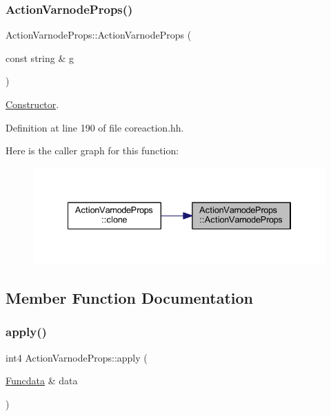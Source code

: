 \subsubsection{\texorpdfstring{ActionVarnodeProps()}{ActionVarnodeProps()}}
{\footnotesize\ttfamily Action\+Varnode\+Props\+::\+Action\+Varnode\+Props (\begin{DoxyParamCaption}\item[{const string \&}]{g }\end{DoxyParamCaption})\hspace{0.3cm}{\ttfamily [inline]}}



\mbox{\hyperlink{class_constructor}{Constructor}}. 



Definition at line 190 of file coreaction.\+hh.

Here is the caller graph for this function\+:
\nopagebreak
\begin{figure}[H]
\begin{center}
\leavevmode
\includegraphics[width=334pt]{class_action_varnode_props_a52f6de156a43bc14318422eb8bb03b64_icgraph}
\end{center}
\end{figure}


\subsection{Member Function Documentation}
\mbox{\label{class_action_varnode_props_a531c9985eb2e6a5796009bea79a465fe}} 
\subsubsection{\texorpdfstring{apply()}{apply()}}
{\footnotesize\ttfamily int4 Action\+Varnode\+Props\+::apply (\begin{DoxyParamCaption}\item[{\mbox{\hyperlink{class_funcdata}{Funcdata}} \&}]{data }\end{DoxyParamCaption})\hspace{0.3cm}{\ttfamily [virtual]}}



